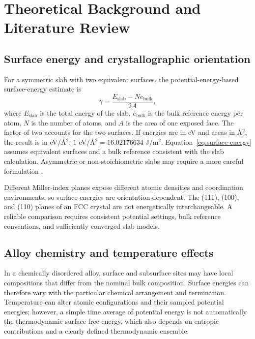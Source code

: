 \section{Theoretical Background and Literature Review}
\subsection{Surface energy and crystallographic orientation}
For a symmetric slab with two equivalent surfaces, the potential-energy-based surface-energy estimate is
\begin{equation}
\gamma = \frac{E_{\mathrm{slab}}-N e_{\mathrm{bulk}}}{2A},
\label{eq:surface-energy}
\end{equation}
where $E_{\mathrm{slab}}$ is the total energy of the slab, $e_{\mathrm{bulk}}$ is the bulk reference energy per atom, $N$ is the number of atoms, and $A$ is the area of one exposed face. The factor of two accounts for the two surfaces. If energies are in eV and areas in \AA$^2$, the result is in eV/\AA$^2$; $1$ eV/\AA$^2 = 16.02176634$ J/m$^2$. Equation~\ref{eq:surface-energy} assumes equivalent surfaces and a bulk reference consistent with the slab calculation. Asymmetric or non-stoichiometric slabs may require a more careful formulation \cite{sun2013slabs,yalcin2024surfflow}.

Different Miller-index planes expose different atomic densities and coordination environments, so surface energies are orientation-dependent. The (111), (100), and (110) planes of an FCC crystal are not energetically interchangeable. A reliable comparison requires consistent potential settings, bulk reference conventions, and sufficiently converged slab models.

\subsection{Alloy chemistry and temperature effects}
In a chemically disordered alloy, surface and subsurface sites may have local compositions that differ from the nominal bulk composition. Surface energies can therefore vary with the particular chemical arrangement and termination. Temperature can alter atomic configurations and their sampled potential energies; however, a simple time average of potential energy is not automatically the thermodynamic surface free energy, which also depends on entropic contributions and a clearly defined thermodynamic ensemble.

